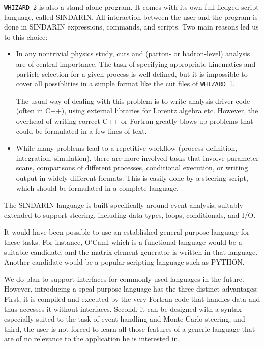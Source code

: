 \documentclass[12pt]{book}
\newcommand{\whizard}{\texttt{WHIZARD}}
\begin{document}
\whizard~2 is also a stand-alone program.  It comes with its own full-fledged
script language, called SINDARIN.  All interaction between the user and the
program is done in SINDARIN expressions, commands, and scripts.  Two main
reasons led us to this choice:
\begin{itemize}
\item 
  In any nontrivial physics study, cuts and (parton- or hadron-level) analysis
  are of central importance.  The task of specifying appropriate kinematics
  and particle selection for a given process is well defined, but it is
  impossible to cover all possiblities in a simple format like the cut files
  of \whizard~1.

  The usual way of dealing with this problem is to write analysis driver code
  (often in C++), using external libraries for Lorentz algebra etc.  However,
  the overhead of writing correct C++ or Fortran greatly blows up problems
  that could be formulated in a few lines of text.
\item
  While many problems lead to a repetitive workflow (process definition,
  integration, simulation), there are more involved tasks that involve
  parameter scans, comparisons of different processes, conditional execution,
  or writing output in widely different formats.  This is easily done by a
  steering script, which should be formulated in a complete language.
\end{itemize}
The SINDARIN language is built specifically around event analysis, suitably
extended to support steering, including data types, loops, conditionals, and
I/O.  

It would have been possible to use an established general-purpose language for
these tasks.  For instance, O'Caml which is a functional language would be a
suitable candidate, and the matrix-element generator is written in that
language.  Another candidate would be a popular scripting language such as
PYTHON.

We do plan to support interfaces for commonly used languages in the future.
However, introducing a speal-purpose language has the three distinct
advantages: First, it is compiled and executed by the very Fortran code that
handles data and thus accesses it without interfaces.  Second, it can be
designed with a syntax especially suited to the task of event handling and
Monte-Carlo steering, and third, the user is not forced to learn all those
features of a generic language that are of no relevance to the application he
is interested in.
\end{document}
